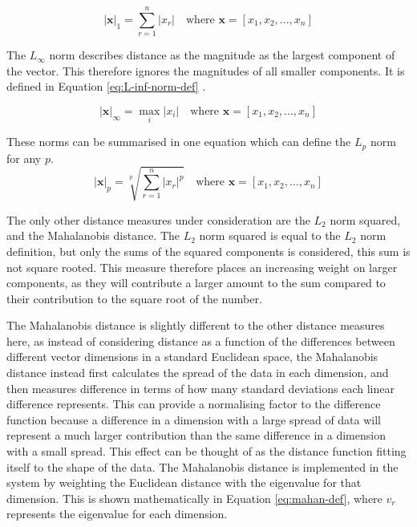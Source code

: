 \begin{appendices}
\begin{equation}
|\mathbf{x}|_1 = \sum_{r=1}^{n} |x_r| \quad \text{where } \mathbf{x} = [ x_1 , x_2, ... , x_n] \label{eq:L1-norm-def}
\end{equation}

The $L_\infty $ norm describes distance as the magnitude as the largest component of the vector. This therefore ignores the magnitudes of all smaller components. It is defined in Equation \ref{eq:L-inf-norm-def} \cite[p. 1081]{gradshteyn2007}.

\begin{equation}
|\mathbf{x}|_\infty = \max_{i} |x_i| \quad \text{where } \mathbf{x} = [ x_1 , x_2, ... , x_n] \label{eq:L-inf-norm-def}
\end{equation}

These norms can be summarised in one equation which can define the $L_p$ norm for any $p$.
\begin{equation}
|\mathbf{x}|_p = \sqrt[p]{\sum_{r=1}^{n} |x_r|^p} \quad \text{where } \mathbf{x} = [ x_1 , x_2, ... , x_n] \label{eq:Lp-norm-def}
\end{equation}

The only other distance measures under consideration are the $L_2$ norm squared, and the Mahalanobis distance. The $L_2$ norm squared is equal to the $L_2$ norm definition, but only the sums of the squared components is considered, this sum is not square rooted. This measure therefore places an increasing weight on larger components, as they will contribute a larger amount to the sum compared to their contribution to the square root of the number.

The Mahalanobis distance is slightly different to the other distance measures here, as instead of considering distance as a function of the differences between different vector dimensions in a standard Euclidean space, the Mahalanobis distance instead first calculates the spread of the data in each dimension, and then measures difference in terms of how many standard deviations each linear difference represents. This can provide a normalising factor to the difference function because a difference in a dimension with a large spread of data will represent a much larger contribution than the same difference in a dimension with a small spread. This effect can be thought of as the distance function fitting itself to the shape of the data. The Mahalanobis distance is implemented in the system by weighting the Euclidean distance with the eigenvalue for that dimension. This is shown mathematically in Equation \ref{eq:mahan-def}, where $v_r$ represents the eigenvalue for each dimension.


\end{appendices}
